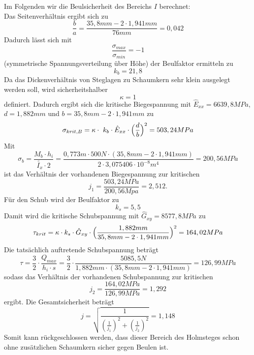 \noindent Im Folgenden wir die Beulsicherheit des Bereichs $I$ berechnet:\\
\noindent Das Seitenverhältnis ergibt sich zu 
\begin{equation}
	\frac{b}{a}=\frac{35,8 mm-2\cdot 1,941 mm}{76 mm}=0,042
\end{equation}
Dadurch lässt sich mit 
\begin{equation}
	\frac{\sigma_{max}}{\sigma_{min}}=-1
\end{equation}
(symmetrische Spannungsverteilung über Höhe) der Beulfaktor ermitteln zu
\begin{equation}
	k_{b} = 21,8
\end{equation}
Da das Dickenverhältnis von Steglagen zu Schaumkern sehr klein ausgelegt werden soll, wird sicherheitshalber
\begin{equation}
	\kappa = 1
\end{equation}
definiert. Dadurch ergibt sich die kritische Biegespannung mit $\hat{E}_{xx}=6639,8MPa$, $d=1,882mm$ und $b=35,8mm-2\cdot 1,941mm$ zu
\begin{equation}
	\sigma_{krit,B}=\kappa\cdot\ k_{b}\cdot \hat{E}_{xx}\cdot\Bigl(\frac{d}{b}\Bigr)^{2}=503,24MPa
\end{equation}
Mit
\begin{equation}
	\sigma_{b}=\frac{M_{b}\cdot {h_{i}}}{\tilde{I_{x}}\cdot 2}=\frac{0,773m\cdot500N\cdot (35,8mm - 2\cdot 1,941mm)}{2\cdot 3,075406\cdot 10^{-8} m^{4} }=200,56 MPa
\end{equation}
ist das Verhältnis der vorhandenen Biegespannung zur kritischen 
\begin{equation}
	j_{1}=\frac{503,24MPa}{200,56 Mpa}=2,512.
\end{equation}
 Für den Schub wird der Beulfaktor zu
\begin{equation}
	k_{s}=5,5
\end{equation}
Damit wird die kritische Schubspannung mit $\hat{G}_{xy}=8577,8MPa$ zu 
\begin{equation}
	\tau_{krit}=\kappa\cdot k_{s}\cdot \hat{G}_{xy}\cdot\Bigl(\frac{1,88 2mm}{35,8 mm - 2\cdot 1,941  mm}\Bigr)^{2}=164,02 MPa
\end{equation}
Die tatsächlich auftretende Schubspannung beträgt 
\begin{equation}
	\tau= \frac{3}{2}\cdot\frac{Q_{max}}{h_{i}\cdot s} =\frac{3}{2}\cdot \frac{5085,5 N}{1,882 mm\cdot(35,8 mm-2\cdot 1,941 mm)}=126,99 MPa
\end{equation}
sodass das Verhältnis der vorhandenen Schubspannung zur kritischen 
\begin{equation}
	j_{2}=\frac{164,02 MPa}{126,99 MPa}= 1,292
\end{equation}
ergibt. Die Gesamtsicherheit beträgt
\begin{equation}
	j=\sqrt{\frac{1}{\left(\frac{1}{j_{1}}\right)^{2}+\left(\frac{1}{j_{2}}\right)^{2}}}=1,148
\end{equation}
Somit kann rückgeschlossen werden, dass dieser Bereich des Holmsteges schon ohne zusätzlichen Schaumkern sicher gegen Beulen ist.\\

